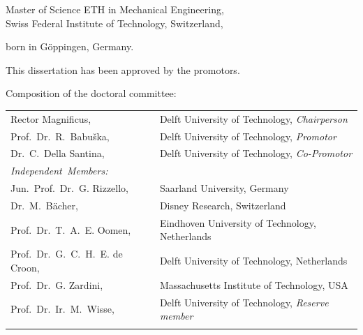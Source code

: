 \begin{titlepage}
\begin{center}
\bigskip
\bigskip

Master of Science ETH in Mechanical Engineering, \\
Swiss Federal Institute of Technology, Switzerland,

born in Göppingen, Germany.

\vspace*{2\bigskipamount}

\end{center}

\clearpage
\thispagestyle{empty}

\noindent This dissertation has been approved by the promotors.


\bigskip
\noindent Composition of the doctoral committee:

\medskip\noindent
\begin{tabular}{p{4.5cm}l}
    Rector Magnificus, & Delft University of Technology, \emph{Chairperson} \\
    Prof.\ Dr.\ R.\ Babu\v{s}ka, & Delft University of Technology, \emph{Promotor} \\
    Dr.\ C.\ Della Santina, & Delft University of Technology, \emph{Co-Promotor} \\

    \medskip
    \mbox{\emph{Independent Members:}} & \\
    Jun.\ Prof.\ Dr.\ G. Rizzello, & Saarland University, Germany\\
    Dr.\ M.\ Bächer, & Disney Research, Switzerland \\
    Prof.\ Dr.\ T.\ A.\ E. Oomen, & Eindhoven University of Technology, Netherlands\\
    Prof.\ Dr.\ G.\ C.\ H.\ E. de Croon, & Delft University of Technology, Netherlands\\
    Prof.\ Dr.\ G. Zardini, & Massachusetts Institute of Technology, USA\\ %
    Prof.\ Dr.\ Ir.\ M.\ Wisse, & Delft University of Technology, \emph{Reserve member} \\ \\


\end{tabular}
\end{titlepage}
